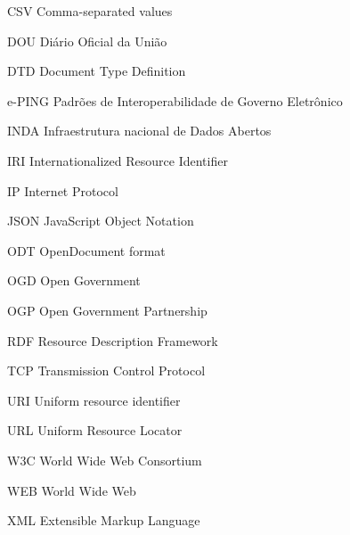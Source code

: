 \begin{siglas}
 
   \item[CSV] Comma-separated values
   \item[DOU] Diário Oficial da União 
   \item[DTD] Document Type Definition
   \item[e-PING] Padrões de Interoperabilidade de Governo Eletrônico
   \item[INDA] Infraestrutura nacional de Dados Abertos
   \item[IRI]  Internationalized Resource Identifier
   \item[IP] Internet Protocol
   \item[JSON] JavaScript Object Notation
   \item[ODT] OpenDocument format
   \item[OGD] Open Government
   \item[OGP] Open Government Partnership
   \item[RDF] Resource Description Framework
   \item[TCP] Transmission Control Protocol
   \item[URI] Uniform resource identifier
   \item[URL]  Uniform Resource Locator
   \item[W3C] World Wide Web Consortium
   \item[WEB] World Wide Web
   \item[XML]  Extensible Markup Language
\end{siglas}
